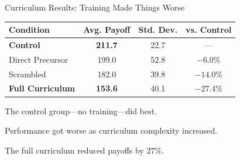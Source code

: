 \documentclass[aspectratio=169]{beamer}
\begin{document}
\begin{frame}{Curriculum Results: Training Made Things Worse}
  
  \begin{table}
    \centering
    \begin{tabular}{lccc}
      \toprule
      Condition & Avg. Payoff & Std. Dev. & vs. Control \\
      \midrule
      \textbf{Control} & \textbf{211.7} & 22.7 & --- \\
      Direct Precursor & 199.0 & 52.8 & $-6.0\%$ \\
      Scrambled & 182.0 & 39.8 & $-14.0\%$ \\
      \textbf{Full Curriculum} & \textbf{153.6} & 40.1 & $\mathbf{-27.4\%}$ \\
      \bottomrule
    \end{tabular}
  \end{table}
  
  \vspace{1em}
  The control group---no training---did best.
  
  \vspace{0.5em}
  Performance got worse as curriculum complexity increased.
  
  \vspace{0.5em}
  The full curriculum reduced payoffs by 27\%.

\end{frame}
\end{document}
